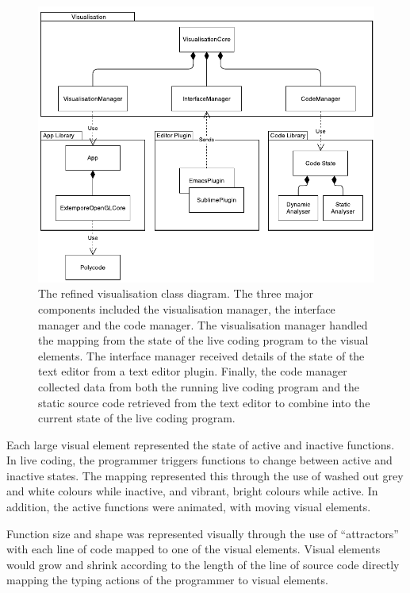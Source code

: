 \begin{figure}
  \centering \includegraphics[width=\columnwidth]{../images/diagrams/visualisation-class-diagram.pdf}
  \caption[The refined visualisation class diagram]{The refined visualisation class diagram. The three major components included the visualisation manager, the interface manager and the code manager. The visualisation manager handled the mapping from the state of the live coding program to the visual elements. The interface manager received details of the state of the text editor from a text editor plugin. Finally, the code manager collected data from both the running live coding program and the static source code retrieved from the text editor to combine into the current state of the live coding program.}
\label{fig:visualisation-class-diagram}
\end{figure}

Each large visual element represented the state of active and inactive functions. In live coding, the programmer triggers functions to change between active and inactive states. The mapping represented this through the use of washed out grey and white colours while inactive, and vibrant, bright colours while active. In addition, the active functions were animated, with moving visual elements.

Function size and shape was represented visually through the use of ``attractors'' with each line of code mapped to one of the visual elements. Visual elements would grow and shrink according to the length of the line of source code directly mapping the typing actions of the programmer to visual elements.  

